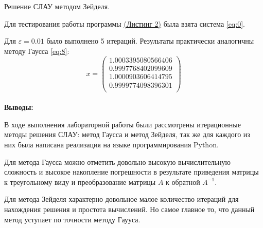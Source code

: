 \documentclass[a4paper, 12pt]{article}   	%
\begin{document}
Решение СЛАУ методом Зейделя.

Для тестирования работы программы \hyperlink{lst:zeidel}{(Листинг 2)} была взята система \eqref{eq:0}. 

Для $\varepsilon = 0.01$ было выполнено 5 итераций. Результаты практически аналогичны методу Гаусса  \eqref{eq:8}:
\begin{equation}\label{eq:8}
x =
 \left(\begin{array}{c} 
1.0003395080566406 \\
0.9997768402099609 \\
1.0000903606414795 \\
0.9999774098396301 \\
\end{array}\right)
\end{equation}
\\


\textbf{Выводы:}

В ходе выполнения лабораторной работы были рассмотрены итерационные методы решения СЛАУ: метод Гаусса и метод Зейделя, так же для каждого из них была написана реализация на языке программирования Python.

Для метода Гаусса можно отметить довольно высокую вычислительную сложность и высокое накопление погрешности в результате приведения матрицы к треугольному виду и преобразование матрицы $A$ к обратной $A^{-1}$.

Для метода Зейделя характерно довольное малое количество итераций для нахождения решения и простота вычислений. Но самое главное то, что данный метод уступает по точности методу Гаууса.
\end{document}
